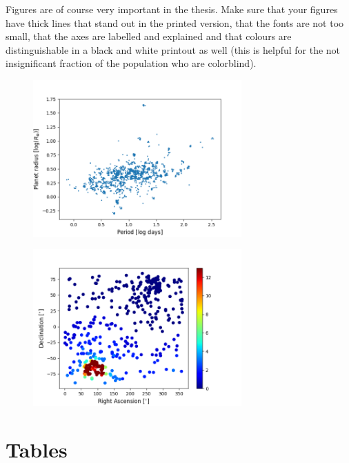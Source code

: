\documentclass[12pt]{report}
\begin{document}
Figures are of course very important in the thesis. Make sure that your figures
have thick lines that stand out in the printed version, that the fonts are not
too small, that the axes are labelled and explained and that colours are
distinguishable in a black and white printout as well (this is helpful for the
not insignificant fraction of the population who are colorblind).
\begin{figure}
		\centering
		\begin{minipage}{.5\textwidth}
 		 \centering
 		 \includegraphics[width=8cm]{img/R_P-plot_5.png}
 		 \label{fig:start}
		\end{minipage}%
		\begin{minipage}{.5\textwidth}
 		 \centering
		  \includegraphics[width=8cm]{img/RA_Dec_Max.png}
		  \label{fig:saturation}
		\end{minipage}
	\end{figure}

\section{Tables}
\end{document}
